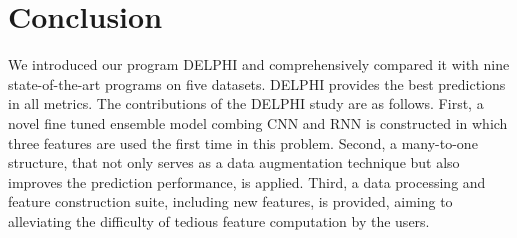 \section{Conclusion}
We introduced our program DELPHI and comprehensively compared it with nine state-of-the-art programs on five datasets. DELPHI provides the best predictions in all metrics. The contributions of the DELPHI study are as follows.
First, a novel fine tuned ensemble model combing CNN and RNN is constructed in which three features are used the first time in this problem. Second, a many-to-one structure, that not only serves as a data augmentation technique but also improves the prediction performance, is applied. Third, a data processing and feature construction suite, including new features, is provided, aiming to alleviating the difficulty of tedious feature computation by the users.